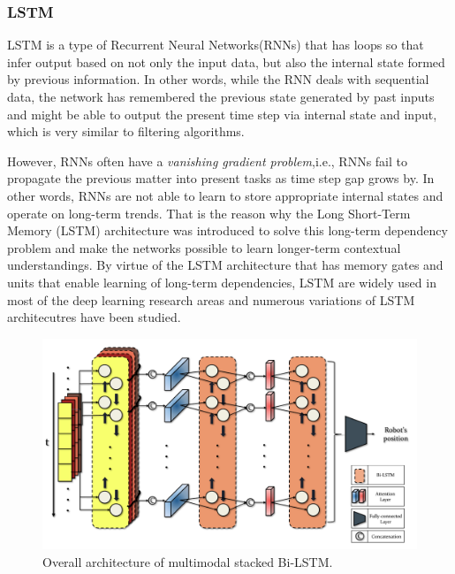 \documentclass[letterpaper, 10 pt, conference]{ieeeconf}  %
\begin{document}
\subsubsection{LSTM}

LSTM is a type of Recurrent Neural Networks(RNNs) that has loops so that infer output based on not only the input data, but also the internal state formed by previous information. In other words, while the RNN deals with sequential data, the network has remembered the previous state generated by past inputs and might be able to output the present time step via internal state and input, which is very similar to filtering algorithms.

However, RNNs often have a \textit{vanishing gradient problem},i.e., RNNs fail to propagate the previous matter into present tasks as time step gap grows by. In other words, RNNs are not able to learn to store appropriate internal states and operate on long-term trends. That is the reason why the Long Short-Term Memory (LSTM) architecture was introduced to solve this long-term dependency problem and make the networks possible to learn longer-term contextual understandings\cite{hochreiter1997long}.
By virtue of the LSTM architecture that has memory gates and units that enable learning of long-term dependencies\cite{zaremba2014learning}, LSTM are widely used in most of the deep learning research areas and numerous variations of LSTM architecutres have been studied.

\begin{figure}[ht]
	
	\centering
	\includegraphics[height=10 cm]{CE554_networks}
	
	\label{fig:example}
	
	\caption{Overall architecture of multimodal stacked Bi-LSTM. }
	
\end{figure}
\end{document}

